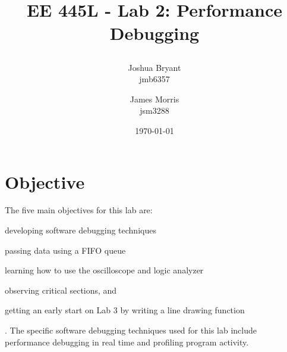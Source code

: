 \documentclass{article}
\title{\begin{LARGE}
	\textbf{EE 445L - Lab 2: Performance Debugging}
\end{LARGE}} %
\author{Joshua Bryant \\ jmb6357 \and James Morris \\ jsm3288} %
\date{\today} %
\begin{document}
\maketitle %


\section{Objective} %
 The five main objectives for this lab are: 
 \begin{inlinelist}
 	\item developing software debugging techniques
 	\item passing data using a FIFO queue
 	\item learning how to use the oscilloscope and logic analyzer
 	\item observing critical sections, and
 	\item getting an early start on Lab 3 by writing a line drawing function
 \end{inlinelist}. The specific software debugging techniques used for this lab include performance debugging in real time and profiling program activity.
 




\end{document}
